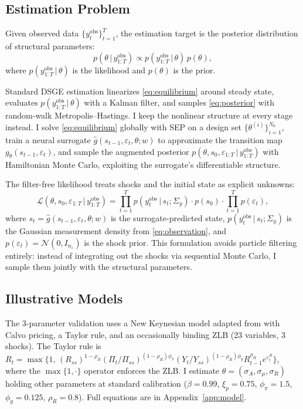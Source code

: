 \documentclass[12pt]{article}
\theoremstyle{plain}
\theoremstyle{definition}
\theoremstyle{remark}
\newcommand{\given}{\,|\,}
\newcommand{\eps}{\varepsilon}
\newcommand{\Sigmay}{\Sigma_y}
\begin{document}
\subsection{Estimation Problem}

Given observed data $\{y_t^{\text{obs}}\}_{t=1}^T$, the estimation target is the posterior distribution of structural parameters:
\begin{equation}
\label{eq:posterior}
p(\theta \given y_{1:T}^{\text{obs}}) \propto p(y_{1:T}^{\text{obs}} \given \theta) \, p(\theta),
\end{equation}
where $p(y_{1:T}^{\text{obs}} \given \theta)$ is the likelihood and $p(\theta)$ is the prior.

Standard DSGE estimation linearizes \eqref{eq:equilibrium} around steady state, evaluates $p(y_{1:T}^{\text{obs}} \given \theta)$ with a Kalman filter, and samples \eqref{eq:posterior} with random-walk Metropolis--Hastings. I keep the nonlinear structure at every stage instead. I solve \eqref{eq:equilibrium} globally with SEP on a design set $\{\theta^{(i)}\}_{i=1}^{N_\theta}$, train a neural surrogate $\hat{g}(s_{t-1}, \eps_t, \theta; w)$ to approximate the transition map $g_\theta(s_{t-1}, \eps_t)$, and sample the augmented posterior $p(\theta, s_0, \eps_{1:T} \given y_{1:T}^{\text{obs}})$ with Hamiltonian Monte Carlo, exploiting the surrogate's differentiable structure.

The filter-free likelihood treats shocks and the initial state as explicit unknowns:
\begin{equation*}
\mathcal{L}(\theta, s_0, \eps_{1:T} \given y_{1:T}^{\text{obs}}) = \prod_{t=1}^T p(y_t^{\text{obs}} \given s_t; \Sigmay) \cdot p(s_0) \cdot \prod_{t=1}^T p(\eps_t),
\end{equation*}
where $s_t = \hat{g}(s_{t-1}, \eps_t, \theta; w)$ is the surrogate-predicted state, $p(y_t^{\text{obs}} \given s_t; \Sigmay)$ is the Gaussian measurement density from \eqref{eq:observation}, and $p(\eps_t) = \mathcal{N}(0, I_{n_\eps})$ is the shock prior. This formulation avoids particle filtering entirely: instead of integrating out the shocks via sequential Monte Carlo, I sample them jointly with the structural parameters.

\subsection{Illustrative Models}
\label{subsec:gali_model}

The 3-parameter validation uses a New Keynesian model adapted from \citet{gali2015monetary} with Calvo pricing, a Taylor rule, and an occasionally binding ZLB (23 variables, 3 shocks). The Taylor rule is $R_t = \max\{ 1, \, (R_{ss})^{1-\rho_R} (\Pi_t/\Pi_{ss})^{(1-\rho_R)\phi_\pi} (Y_t/Y_{ss})^{(1-\rho_R)\phi_y} R_{t-1}^{\rho_R} e^{\varepsilon_t^R} \}$, where the $\max\{1,\cdot\}$ operator enforces the ZLB. I estimate $\theta = (\sigma_A, \sigma_\mu, \sigma_R)$ holding other parameters at standard calibration ($\beta = 0.99$, $\xi_p = 0.75$, $\phi_\pi = 1.5$, $\phi_y = 0.125$, $\rho_R = 0.8$). Full equations are in Appendix~\ref{app:model}.
\end{document}
